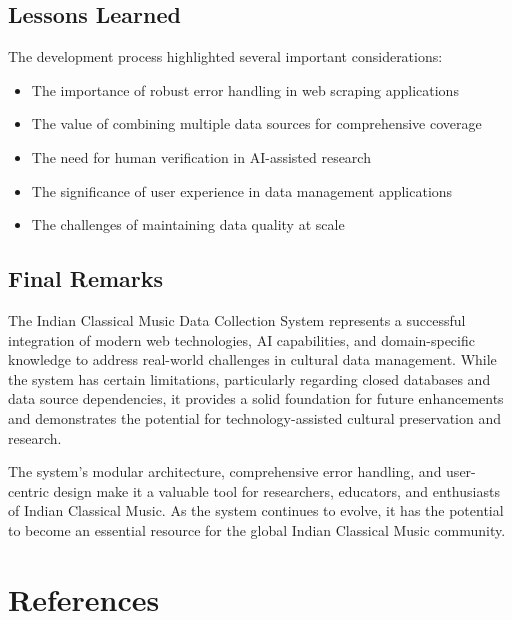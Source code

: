 \documentclass[12pt,a4paper]{article}
\begin{document}
\subsection{Lessons Learned}

The development process highlighted several important considerations:

\begin{itemize}
    \item The importance of robust error handling in web scraping applications
    \item The value of combining multiple data sources for comprehensive coverage
    \item The need for human verification in AI-assisted research
    \item The significance of user experience in data management applications
    \item The challenges of maintaining data quality at scale
\end{itemize}

\subsection{Final Remarks}

The Indian Classical Music Data Collection System represents a successful integration of modern web technologies, AI capabilities, and domain-specific knowledge to address real-world challenges in cultural data management. While the system has certain limitations, particularly regarding closed databases and data source dependencies, it provides a solid foundation for future enhancements and demonstrates the potential for technology-assisted cultural preservation and research.

The system's modular architecture, comprehensive error handling, and user-centric design make it a valuable tool for researchers, educators, and enthusiasts of Indian Classical Music. As the system continues to evolve, it has the potential to become an essential resource for the global Indian Classical Music community.

\section{References}
\end{document}
